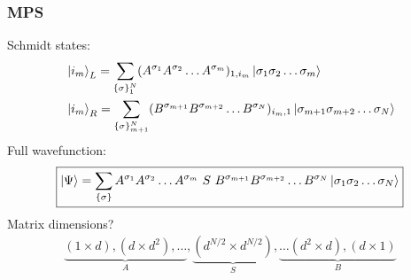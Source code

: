 \documentclass{beamer}
\theoremstyle{definition}
\begin{document}
\begin{frame}
	\frametitle{MPS}
	Schmidt states:
	\begin{align*}
		&\ket{i_m}_L = \sum_{\{\sigma\}_1^N} (A^{\sigma_1}A^{\sigma_2}\dots A^{\sigma_m})_{1,i_m}  \ket{\sigma_1 \sigma_2\dots\sigma_m} \\
		&\ket{i_m}_R = \sum_{\{\sigma\}_{m+1}^N} (B^{\sigma_{m+1}}B^{\sigma_{m+2}}\dots B^{\sigma_N})_{i_m,1}  \ket{\sigma_{m+1}\sigma_{m+2}\dots\sigma_N} 
	\end{align*}
	Full wavefunction:
	\begin{align*}
		\boxed{\ket{\Psi} = \sum_{\{\sigma\}}    A^{\sigma_1}A^{\sigma_2}\dots A^{\sigma_m}  \,\,{S}\,\, B^{\sigma_{m+1}}B^{\sigma_{m+2}}\dots B^{\sigma_N}  \ket{\sigma_1\sigma_2\dots \sigma_N}}
	\end{align*}
	Matrix dimensions?
	\begin{align*}
		\underbrace{(1\times d), (d\times d^2), \dots }_{A}, \underbrace{(d^{N/2}\times d^{N/2})}_{S},  \underbrace{\dots (d^2\times d), (d\times 1)}_{B}
	\end{align*}


\end{frame}
\end{document}
